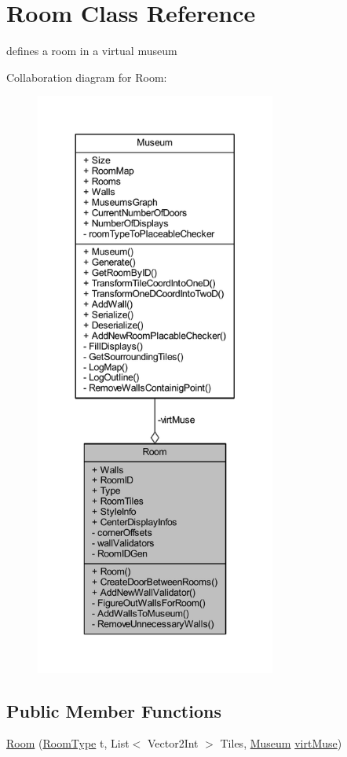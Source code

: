 \hypertarget{class_room}{}\section{Room Class Reference}
\label{class_room}


defines a room in a virtual museum  




Collaboration diagram for Room\+:
\nopagebreak
\begin{figure}[H]
\begin{center}
\leavevmode
\includegraphics[height=550pt]{class_room__coll__graph}
\end{center}
\end{figure}
\subsection*{Public Member Functions}
\begin{DoxyCompactItemize}
\item 
\mbox{\hyperlink{class_room_aae232017aa8caf310d109e90c8821227}{Room}} (\mbox{\hyperlink{_room_8cs_ab540f7414f306325d92272bcef1e34e1}{Room\+Type}} t, List$<$ Vector2\+Int $>$ Tiles, \mbox{\hyperlink{class_museum}{Museum}} \mbox{\hyperlink{class_room_a7b3cf4bdc95a8c1bf69ae4ff71b4f02a}{virt\+Muse}})
\end{DoxyCompactItemize}
